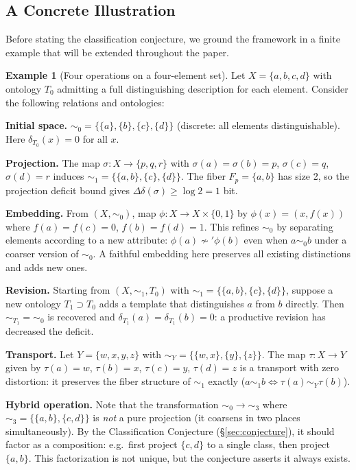 \documentclass[12pt, a4paper]{article}
\theoremstyle{plain}
\theoremstyle{definition}
\newtheorem{example}[theorem]{Example}
\theoremstyle{remark}
\newcommand{\Ddelta}{\Delta\delta}
\begin{document}
\subsection{A Concrete Illustration}
\label{subsec:example}

Before stating the classification conjecture, we ground the framework in a
finite example that will be extended throughout the paper.

\begin{example}[Four operations on a four-element set]
\label{ex:four}
Let $X=\{a,b,c,d\}$ with ontology $T_0$ admitting a full distinguishing
description for each element. Consider the following relations and ontologies:

\medskip
\noindent\textbf{Initial space.}
$\sim_0 = \bigl\{\{a\},\{b\},\{c\},\{d\}\bigr\}$ (discrete: all elements
distinguishable). Here $\delta_{T_0}(x)=0$ for all $x$.

\medskip
\noindent\textbf{Projection.}
The map $\sigma:X\to\{p,q,r\}$ with $\sigma(a)=\sigma(b)=p$, $\sigma(c)=q$,
$\sigma(d)=r$ induces $\sim_1=\bigl\{\{a,b\},\{c\},\{d\}\bigr\}$. The
fiber $F_p=\{a,b\}$ has size 2, so the projection deficit bound gives
$\Ddelta(\sigma)\ge\log 2=1$ bit.

\medskip
\noindent\textbf{Embedding.}
From $(X,\sim_0)$, map $\phi:X\to X\times\{0,1\}$ by $\phi(x)=(x,f(x))$
where $f(a)=f(c)=0$, $f(b)=f(d)=1$. This refines $\sim_0$ by separating
elements according to a new attribute: $\phi(a)\not\sim'\phi(b)$ even when
$a\sim_0 b$ under a coarser version of $\sim_0$. A faithful embedding
here preserves all existing distinctions and adds new ones.

\medskip
\noindent\textbf{Revision.}
Starting from $(X,\sim_1,T_0)$ with $\sim_1=\bigl\{\{a,b\},\{c\},\{d\}\bigr\}$,
suppose a new ontology $T_1\supset T_0$ adds a template that distinguishes
$a$ from $b$ directly. Then $\sim_{T_1}=\sim_0$ is recovered and
$\delta_{T_1}(a)=\delta_{T_1}(b)=0$: a productive revision has decreased
the deficit.

\medskip
\noindent\textbf{Transport.}
Let $Y=\{w,x,y,z\}$ with $\sim_Y=\bigl\{\{w,x\},\{y\},\{z\}\bigr\}$.
The map $\tau:X\to Y$ given by $\tau(a)=w$, $\tau(b)=x$, $\tau(c)=y$,
$\tau(d)=z$ is a transport with zero distortion: it preserves the fiber
structure of $\sim_1$ exactly ($a\sim_1 b\iff\tau(a)\sim_Y\tau(b)$).

\medskip
\noindent\textbf{Hybrid operation.}
Note that the transformation $\sim_0\to\sim_3$ where
$\sim_3=\bigl\{\{a,b\},\{c,d\}\bigr\}$ is \emph{not} a pure projection
(it coarsens in two places simultaneously). By the Classification Conjecture
(\S\ref{sec:conjecture}), it should factor as a composition: e.g.\ first
project $\{c,d\}$ to a single class, then project $\{a,b\}$. This factorization
is not unique, but the conjecture asserts it always exists.
\end{example}
\end{document}

